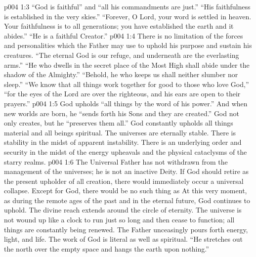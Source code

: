\vs p004 1:3 “God is faithful” and “all his commandments are just.” “His faithfulness is established in the very skies.” “Forever, O Lord, your word is settled in heaven. Your faithfulness is to all generations; you have established the earth and it abides.” “He is a faithful Creator.”
\vs p004 1:4 There is no limitation of the forces and personalities which the Father may use to uphold his purpose and sustain his creatures. “The eternal God is our refuge, and underneath are the everlasting arms.” “He who dwells in the secret place of the Most High shall abide under the shadow of the Almighty.” “Behold, he who keeps us shall neither slumber nor sleep.” “We know that all things work together for good to those who love God,” “for the eyes of the Lord are over the righteous, and his ears are open to their prayers.”
\vs p004 1:5 God upholds “all things by the word of his power.” And when new worlds are born, he “sends forth his Sons and they are created.” God not only creates, but he “preserves them all.” God constantly upholds all things material and all beings spiritual. The universes are eternally stable. There is stability in the midst of apparent instability. There is an underlying order and security in the midst of the energy upheavals and the physical cataclysms of the starry realms.
\vs p004 1:6 The Universal Father has not withdrawn from the management of the universes; he is not an inactive Deity. If God should retire as the present upholder of all creation, there would immediately occur a universal collapse. Except for God, there would be no such thing as  At this very moment, as during the remote ages of the past and in the eternal future, God continues to uphold. The divine reach extends around the circle of eternity. The universe is not wound up like a clock to run just so long and then cease to function; all things are constantly being renewed. The Father unceasingly pours forth energy, light, and life. The work of God is literal as well as spiritual. “He stretches out the north over the empty space and hangs the earth upon nothing.”
